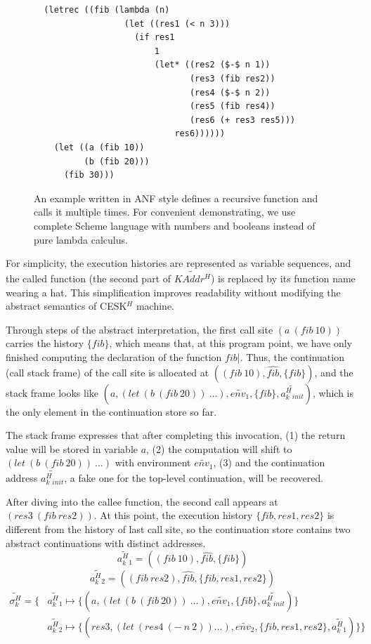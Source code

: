 \documentclass[12pt]{report}
\begin{document}
\begin{figure}
\small
{}
\begin{lstlisting}
  (letrec ((fib (lambda (n)
                  (let ((res1 (< n 3)))
                    (if res1
                        1
                        (let* ((res2 ($-$ n 1))
                               (res3 (fib res2))
                               (res4 ($-$ n 2))
                               (res5 (fib res4))
                               (res6 (+ res3 res5)))
                            res6))))))
    (let ((a (fib 10))
          (b (fib 20)))
      (fib 30)))
\end{lstlisting}
\caption[A recursive program example in ANF]{
An example written in ANF style defines a recursive function and calls it multiple times.
For convenient  demonstrating, we use complete Scheme language with numbers and booleans instead of pure lambda calculus.
}
\label{fig:anf-fib}
\end{figure}

For simplicity, the execution histories are represented as variable sequences, and the called function (the second part of $\widetilde{KAddr^H}$) is replaced by its function name wearing a hat.
This simplification improves readability without modifying the abstract semantics of CESK$^H$ machine.

Through steps of the abstract interpretation, the first call site $(a\ (fib\ 10))$ carries the history $\{fib\}$,
which means that, at this program point, we have only finished computing the declaration of the function $fib$|.
Thus, the continuation (call stack frame) of the call site is allocated at $((fib\ 10), \widehat{fib}, \{fib\})$, and the stack frame looks like $(a, (let\ (b\ (fib\ 20))\ \dots), \widetilde{env_1}, \{fib\}, \widetilde{a^H_k{}_{init}})$, which is the only element in the continuation store so far.

The stack frame expresses that after completing this invocation,
(1) the return value will be stored in variable $a$,
(2) the computation will shift to $(let\ (b\ (fib\ 20))\ \dots)$ with environment $\widetilde{env_1}$,
(3) and the continuation address $\widetilde{a^H_k{}_{init}}$, a fake one for the top-level continuation, will be recovered.

After diving into the callee function, the second call appears at $(res3\ (fib\ res2))$. At this point, the execution history $\{fib, res1, res2\}$ is different from the history of last call site, so the continuation store contains two abstract continuations with distinct addresses.
\[
\widetilde{a^H_k{}_1} = ((fib\ 10), \widehat{fib}, \{fib\})
\]
\[
\widetilde{a^H_k{}_2} = ((fib\ res2), \widehat{fib}, \{fib, res1, res2\})
\]
\[
\begin{aligned}
\label{eq:show-stack}
\widetilde{\sigma_k^H} = \{ {}& \widetilde{a^H_k{}_1} \mapsto \{(a, (let\ (b\ (fib\ 20))\ \dots), \widetilde{env_1}, \{fib\}, \widetilde{a^H_k{}_{init}})\}  {} \\
                              & \widetilde{a^H_k{}_2} \mapsto \{(res3, (let\ (res4\ (-\ n\ 2)) \dots), \widetilde{env_2}, \{fib, res1, res2\}, \widetilde{a^H_k{}_1})\} \}
\end{aligned}
\]
\end{document}
